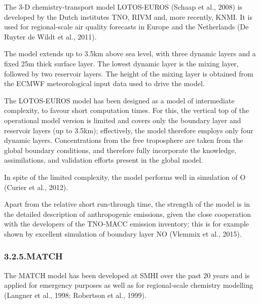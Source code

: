 \documentclass[9pt]{report}
\begin{document}
\noindent{}The 3-D chemistry-transport model LOTOS-EUROS (Schaap et al., 2008) is developed by the Dutch institutes TNO, RIVM and, more recently, KNMI.
It is used for regional-scale air quality forecasts in Europe and the Netherlands (De Ruyter de Wildt et al., 2011).%

The model extends up to 3.5km above sea level, with three dynamic layers and a ﬁxed 25m thick surface layer. 
The lowest dynamic layer is the mixing layer, followed by two reservoir layers. 
The height of the mixing layer is obtained from the ECMWF meteorological input data used to drive the model.%

The LOTOS-EUROS model has been designed as a model of intermediate complexity, to favour short computation times. 
For this, the vertical top of the operational model version is limited and covers only the boundary layer and reservoir layers (up to 3.5km); effectively, the model therefore employs only four dynamic layers. 
Concentrations from the free troposphere are taken from the global boundary conditions, and therefore fully incorporate the knowledge, assimilations, and validation efforts present in the global model.%

In spite of the limited complexity, the model performs well in simulation of O (Curier et al., 2012).%

Apart from the relative short run-through time, the strength of the model is in the detailed description of anthropogenic emissions, given the close cooperation with the developers of the TNO-MACC emission inventory; this is for example shown by excellent simulation of boundary layer NO (Vlemmix et al., 2015).%

\subsubsection{3.2.5.\hspace*{0.5em}MATCH}\label{sec-match}%

\noindent{}The MATCH model has been developed at SMHI over the past 20 years and is applied for emergency purposes as well as for regional-scale chemistry modelling (Langner et al., 1998; Robertson et al., 1999).%
\end{document}
